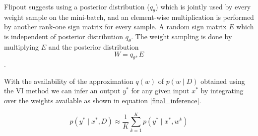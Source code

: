 \documentclass[10pt,twocolumn,letterpaper]{article}
\begin{document}
Flipout suggests using a posterior distribution ($q_{\theta}$) which is jointly used by every weight sample on the mini-batch, and an element-wise multiplication is performed by another rank-one sign matrix for every sample. A random sign matrix $E$ which is independent of posterior distribution $q_{\theta}$. The weight sampling is done by multiplying $E$ and the posterior distribution $$W = q_{\theta}, E$$.

With the availability of the approximation $q(w)$ of $p(w \mid D)$ obtained using the VI method we can infer an output $y^{*}$ for any given input $x^{*}$ by integrating over the weights available as shown in equation \ref{final_inference}.

\begin{equation}
    \label{final_inference}
    p\left(y^{*} \mid x^{*}, D\right) \approx \frac{1}{K} \sum_{k=1}^{K} p\left(y^{*} \mid x^{*}, w^{k}\right)
\end{equation}
    
        
\end{document}
